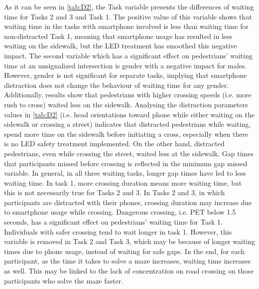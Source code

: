  As it can be seen in \cref{tab:D2}, the Task variable presents the differences of waiting time for Tasks 2 and 3 and Task 1. The positive value of this variable shows that waiting time in the tasks with smartphone involved is less than waiting time for non-distracted Task 1, meaning that smartphone usage has resulted in less waiting on the sidewalk, but the LED treatment has smoothed this negative impact. The second variable which has a significant effect on pedestrians’ waiting time at an unsignalized intersection is gender with a negative impact for males. However, gender is not significant for separate tasks, implying that smartphone distraction does not change the behaviour of waiting time for any gender. Additionally, results show that pedestrians with higher crossing speeds (i.e. more rush to cross) waited less on the sidewalk. Analysing the distraction parameters values in \cref{tab:D2} (i.e. head orientations toward phone while either waiting on the sidewalk or crossing a street) indicates that distracted pedestrians while waiting, spend more time on the sidewalk before initiating a cross, especially when there is no LED safety treatment implemented. On the other hand, distracted pedestrians, even while crossing the street, waited less at the sidewalk. Gap times that participants missed before crossing is reflected in the minimum gap missed variable. In general, in all three waiting tasks, longer gap times have led to less waiting time. In task 1, more crossing duration means more waiting time, but this is not necessarily true for Tasks 2 and 3. In Tasks 2 and 3, in which participants are distracted with their phones, crossing duration may increase due to smartphone usage while crossing. Dangerous crossing, i.e. PET below 1.5 seconds, has a significant effect on pedestrians’ waiting time for Task 1. Individuals with safer crossing tend to wait longer in task 1. However, this variable is removed in Task 2 and Task 3, which may be because of longer waiting times due to phone usage, instead of waiting for safe gaps. In the end, for each participant, as the time it takes to solve a maze increases, waiting time increases as well. This may be linked to the lack of concentration on road crossing on those participants who solve the maze faster.
